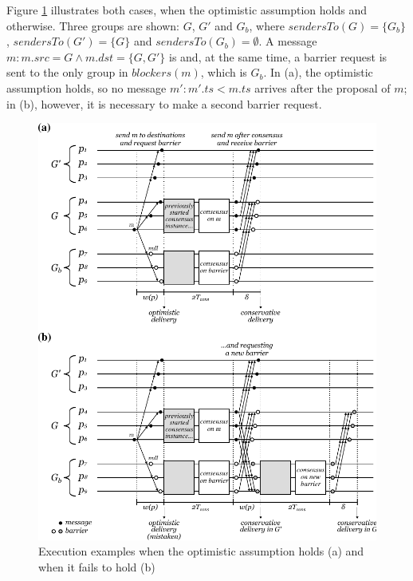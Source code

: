 \documentclass[times, 10pt]{article}
\begin{document}
Figure \ref{fig:optdel} illustrates both cases, when the optimistic assumption holds and otherwise. Three groups are shown: $G$, $G'$ and $G_b$, where $sendersTo(G) = \{G_b\}$, $sendersTo(G') = \{G\}$ and \mbox{$sendersTo(G_b) = \emptyset$}. A message $m : m.src = G \wedge m.dst = \{G, G'\}$ is \amcast{} and, at the same time, a barrier request is sent to the only group in $blockers(m)$, which is $G_b$. In (a), the optimistic assumption holds, so no message $m' : m'.ts < m.ts$ arrives after the proposal of $m$; in (b), however, it is necessary to make a second barrier request.

\begin{figure} 
  \centering
  \includegraphics[width=0.8\linewidth]{images/optdel}
  \caption{Execution examples when the optimistic assumption holds (a) and when it fails to hold (b)}
  \label{fig:optdel}
\end{figure}
\end{document}
